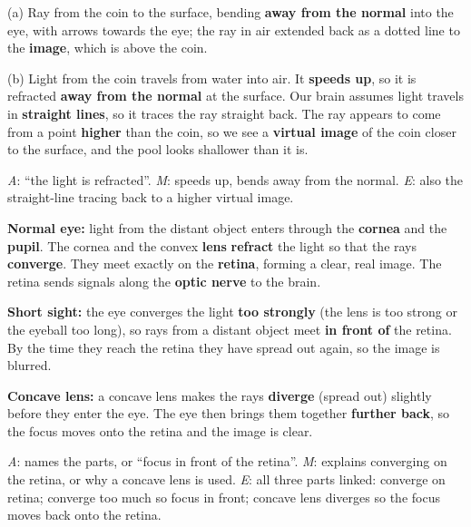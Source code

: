\documentclass[11pt]{article}
\begin{document}
\begin{minipage}[t]{0.52\textwidth}
\vspace{0pt}
 (a) Ray from the coin to the surface, bending \textbf{away from the normal} into the eye, with arrows towards the eye; the ray in air extended back as a dotted line to the \textbf{image}, which is above the coin.\par
\end{minipage}\hfill
\begin{minipage}[t]{0.44\textwidth}
\vspace{0pt}\centering{}
\end{minipage}\par
(b) Light from the coin travels from water into air. It \textbf{speeds up}, so it is refracted \textbf{away from the normal} at the surface. Our brain assumes light travels in \textbf{straight lines}, so it traces the ray straight back. The ray appears to come from a point \textbf{higher} than the coin, so we see a \textbf{virtual image} of the coin closer to the surface, and the pool looks shallower than it is.\par
\emph{A}: ``the light is refracted''. \emph{M}: speeds up, bends away from the normal. \emph{E}: also the straight-line tracing back to a higher virtual image.

 \textbf{Normal eye:} light from the distant object enters through the \textbf{cornea} and the \textbf{pupil}. The cornea and the convex \textbf{lens} \textbf{refract} the light so that the rays \textbf{converge}. They meet exactly on the \textbf{retina}, forming a clear, real image. The retina sends signals along the \textbf{optic nerve} to the brain.\par
\textbf{Short sight:} the eye converges the light \textbf{too strongly} (the lens is too strong or the eyeball too long), so rays from a distant object meet \textbf{in front of} the retina. By the time they reach the retina they have spread out again, so the image is blurred.\par
\textbf{Concave lens:} a concave lens makes the rays \textbf{diverge} (spread out) slightly before they enter the eye. The eye then brings them together \textbf{further back}, so the focus moves onto the retina and the image is clear.\par
\emph{A}: names the parts, or ``focus in front of the retina''. \emph{M}: explains converging on the retina, or why a concave lens is used. \emph{E}: all three parts linked: converge on retina; converge too much so focus in front; concave lens diverges so the focus moves back onto the retina.
\end{document}
